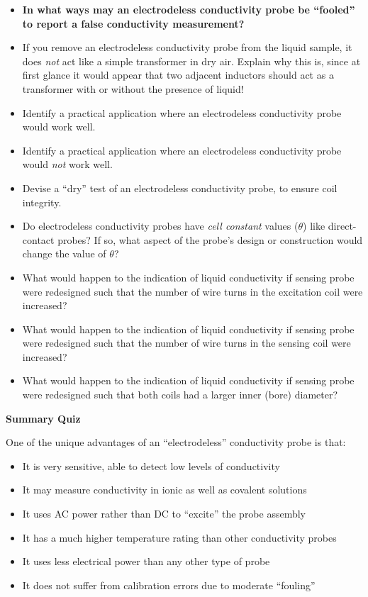 \begin{itemize}
\item{} {\bf In what ways may an electrodeless conductivity probe be ``fooled'' to report a false conductivity measurement?}
\item{} If you remove an electrodeless conductivity probe from the liquid sample, it does {\it not} act like a simple transformer in dry air.  Explain why this is, since at first glance it would appear that two adjacent inductors should act as a transformer with or without the presence of liquid!
\item{} Identify a practical application where an electrodeless conductivity probe would work well.
\item{} Identify a practical application where an electrodeless conductivity probe would {\it not} work well.
\item{} Devise a ``dry'' test of an electrodeless conductivity probe, to ensure coil integrity.
\item{} Do electrodeless conductivity probes have {\it cell constant} values ($\theta$) like direct-contact probes?  If so, what aspect of the probe's design or construction would change the value of $\theta$?
\item{} What would happen to the indication of liquid conductivity if sensing probe were redesigned such that the number of wire turns in the excitation coil were increased?
\item{} What would happen to the indication of liquid conductivity if sensing probe were redesigned such that the number of wire turns in the sensing coil were increased?
\item{} What would happen to the indication of liquid conductivity if sensing probe were redesigned such that both coils had a larger inner (bore) diameter?
\end{itemize}












\vfil \eject

\noindent
{\bf Summary Quiz}

One of the unique advantages of an ``electrodeless'' conductivity probe is that:

\begin{itemize}
\item{} It is very sensitive, able to detect low levels of conductivity
\vskip 5pt
\item{} It may measure conductivity in ionic as well as covalent solutions
\vskip 5pt
\item{} It uses AC power rather than DC to ``excite'' the probe assembly
\vskip 5pt
\item{} It has a much higher temperature rating than other conductivity probes
\vskip 5pt
\item{} It uses less electrical power than any other type of probe
\vskip 5pt
\item{} It does not suffer from calibration errors due to moderate ``fouling''
\end{itemize}






